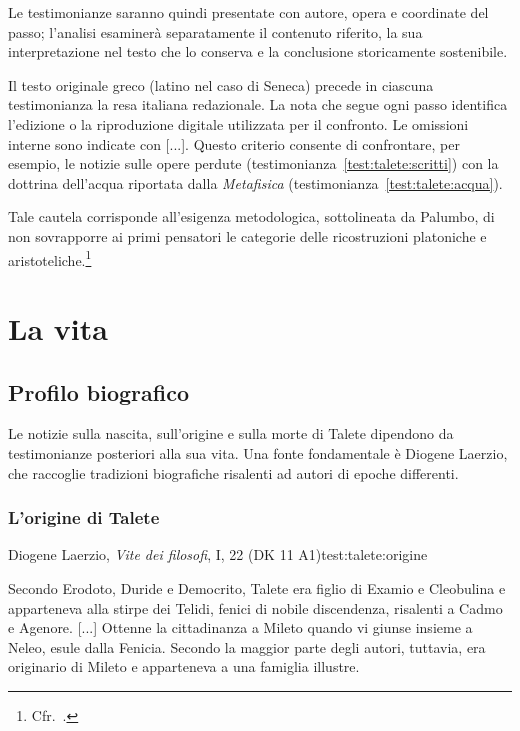 Le testimonianze saranno quindi presentate con autore, opera e coordinate del passo; l'analisi esaminerà separatamente il contenuto riferito, la sua interpretazione nel testo che lo conserva e la conclusione storicamente sostenibile.

Il testo originale greco (latino nel caso di Seneca) precede in ciascuna testimonianza la resa italiana redazionale. La nota che segue ogni passo identifica l'edizione o la riproduzione digitale utilizzata per il confronto. Le omissioni interne sono indicate con [...]. Questo criterio consente di confrontare, per esempio, le notizie sulle opere perdute (testimonianza~\ref{test:talete:scritti}) con la dottrina dell'acqua riportata dalla \emph{Metafisica} (testimonianza~\ref{test:talete:acqua}).

Tale cautela corrisponde all'esigenza metodologica, sottolineata da Palumbo, di non sovrapporre ai primi pensatori le categorie delle ricostruzioni platoniche e aristoteliche.\footnote{Cfr.\ \cite[17--19]{palumbo2015}.}

\section{La vita}

\subsection{Profilo biografico}

Le notizie sulla nascita, sull'origine e sulla morte di Talete dipendono da testimonianze posteriori alla sua vita. Una fonte fondamentale è Diogene Laerzio, che raccoglie tradizioni biografiche risalenti ad autori di epoche differenti.

\subsubsection{L'origine di Talete}

\begin{testimonianza}{Diogene Laerzio, \emph{Vite dei filosofi}, I, 22 (DK 11 A1)}{test:talete:origine}
\smallskip
{}\par
Secondo Erodoto, Duride e Democrito, Talete era figlio di Examio e Cleobulina e apparteneva alla stirpe dei Telidi, fenici di nobile discendenza, risalenti a Cadmo e Agenore. [...] Ottenne la cittadinanza a Mileto quando vi giunse insieme a Neleo, esule dalla Fenicia. Secondo la maggior parte degli autori, tuttavia, era originario di Mileto e apparteneva a una famiglia illustre.
\end{testimonianza}

